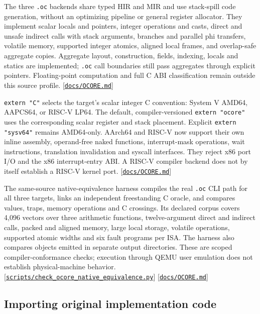 \documentclass[11pt,oneside]{article}
\newcommand{\src}[1]{\textcolor{OSlate}{\scriptsize[\href{https://github.com/lostadi/OSTADIX/blob/c0b02c326b2329a95ba52447c7180bc93957cd57/#1}{\nolinkurl{#1}}]}\allowbreak}
\begin{document}
The three \texttt{.oc} backends share typed HIR and MIR and use stack-spill
code generation, without an optimizing pipeline or general register allocator.
They implement scalar locals and pointers, integer operations and casts,
direct and unsafe indirect calls with stack arguments, branches and parallel
phi transfers, volatile memory, supported integer atomics, aligned local
frames, and overlap-safe aggregate copies. Aggregate layout, construction,
fields, indexing, locals and statics are implemented; \texttt{.oc} call
boundaries still pass aggregates through explicit pointers. Floating-point
computation and full C ABI classification remain outside this source profile.
\src{docs/OCORE.md}

\texttt{extern "C"} selects the target's scalar integer C convention:
System V AMD64, AAPCS64, or RISC-V LP64. The default, compiler-versioned
\texttt{extern "ocore"} uses the corresponding scalar register and stack
placement. Explicit \texttt{extern "sysv64"} remains AMD64-only. AArch64 and
RISC-V now support their own inline assembly, operand-free naked functions,
interrupt-mask operations, wait instructions, translation invalidation and
syscall interfaces. They reject x86 port I/O and the x86 interrupt-entry ABI.
A RISC-V compiler backend does not by itself establish a RISC-V kernel port.
\src{docs/OCORE.md}

The same-source native-equivalence harness compiles the real \texttt{.oc}
CLI path for all three targets, links an independent freestanding C oracle,
and compares values, traps, memory operations and C crossings. Its declared
corpus covers 4,096 vectors over three arithmetic functions, twelve-argument
direct and indirect calls, packed and aligned memory, large local storage,
volatile operations, supported atomic widths and six fault programs per ISA.
The harness also compares objects emitted in separate output directories.
These are scoped compiler-conformance checks; execution through QEMU user
emulation does not establish physical-machine behavior.
\src{scripts/check_ocore_native_equivalence.py}
\src{docs/OCORE.md}

\subsection{Importing original implementation code}
\label{sec:native-import}
\end{document}
